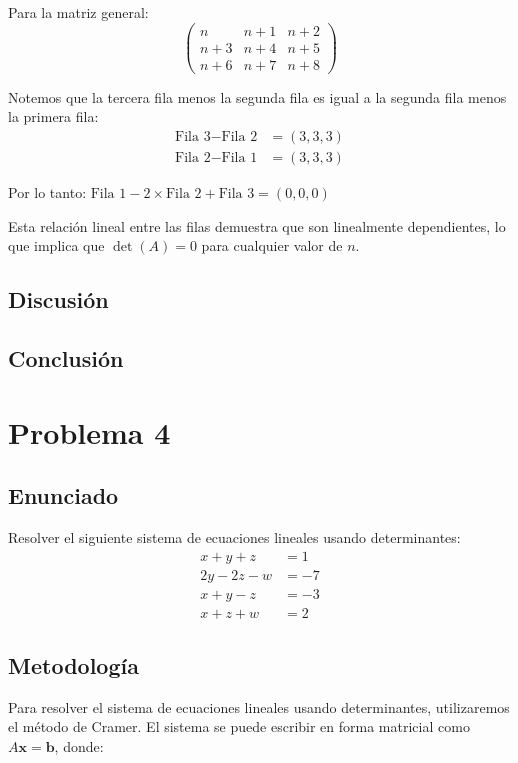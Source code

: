 \documentclass{article}
\begin{document}
Para la matriz general:
$$\begin{pmatrix}
n & n+1 & n+2 \\
n+3 & n+4 & n+5 \\
n+6 & n+7 & n+8
\end{pmatrix}$$

Notemos que la tercera fila menos la segunda fila es igual a la segunda fila menos la primera fila:
\begin{align}
\text{Fila 3} - \text{Fila 2} &= (3, 3, 3) \\
\text{Fila 2} - \text{Fila 1} &= (3, 3, 3)
\end{align}

Por lo tanto: $\text{Fila 1} - 2 \times \text{Fila 2} + \text{Fila 3} = (0, 0, 0)$

Esta relación lineal entre las filas demuestra que son linealmente dependientes, lo que implica que $\det(A) = 0$ para cualquier valor de $n$.

\subsection{Discusión}

\subsection{Conclusión}

\section{Problema 4}

\subsection{Enunciado}
Resolver el siguiente sistema de ecuaciones lineales usando determinantes:
\begin{align}
x + y + z &= 1 \\
2y - 2z - w &= -7 \\
x + y - z &= -3 \\
x + z + w &= 2
\end{align}

\subsection{Metodología}

Para resolver el sistema de ecuaciones lineales usando determinantes, utilizaremos el método de Cramer. El sistema se puede escribir en forma matricial como $A\mathbf{x} = \mathbf{b}$, donde:
\end{document}
